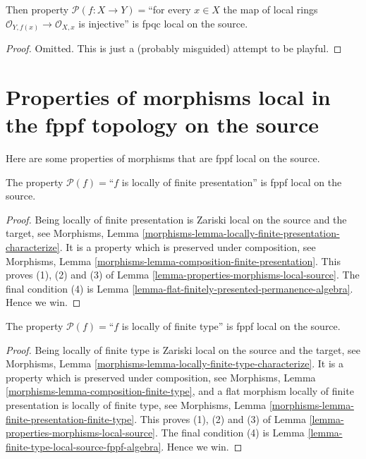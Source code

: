 \begin{lemma}
\label{lemma-injective-local-rings-fpqc-local-source}
Then property
$\mathcal{P}(f : X \to Y)=$``for every $x \in X$ the map of local
rings $\mathcal{O}_{Y, f(x)} \to \mathcal{O}_{X, x}$ is injective''
is fpqc local on the source.
\end{lemma}

\begin{proof}
Omitted. This is just a (probably misguided) attempt to be playful.
\end{proof}





\section{Properties of morphisms local in the fppf topology on the source}
\label{section-fppf-local-source}

\noindent
Here are some properties of morphisms that are fppf local on the source.

\begin{lemma}
\label{lemma-locally-finite-presentation-fppf-local-source}
The property $\mathcal{P}(f)=$``$f$ is locally of finite presentation''
is fppf local on the source.
\end{lemma}

\begin{proof}
Being locally of finite presentation is Zariski local on the source
and the target, see Morphisms,
Lemma \ref{morphisms-lemma-locally-finite-presentation-characterize}.
It is a property which is preserved under composition, see
Morphisms, Lemma \ref{morphisms-lemma-composition-finite-presentation}.
This proves
(1), (2) and (3) of Lemma \ref{lemma-properties-morphisms-local-source}.
The final condition (4) is
Lemma \ref{lemma-flat-finitely-presented-permanence-algebra}. Hence we win.
\end{proof}

\begin{lemma}
\label{lemma-locally-finite-type-fppf-local-source}
The property $\mathcal{P}(f)=$``$f$ is locally of finite type''
is fppf local on the source.
\end{lemma}

\begin{proof}
Being locally of finite type is Zariski local on the source
and the target, see Morphisms,
Lemma \ref{morphisms-lemma-locally-finite-type-characterize}.
It is a property which is preserved under composition, see
Morphisms, Lemma \ref{morphisms-lemma-composition-finite-type}, and
a flat morphism locally of finite presentation is locally of finite type, see
Morphisms, Lemma \ref{morphisms-lemma-finite-presentation-finite-type}.
This proves
(1), (2) and (3) of Lemma \ref{lemma-properties-morphisms-local-source}.
The final condition (4) is
Lemma \ref{lemma-finite-type-local-source-fppf-algebra}. Hence we win.
\end{proof}


